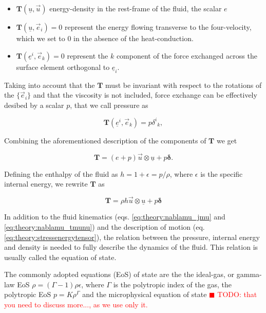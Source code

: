 \documentclass[11pt,a4paper,headinclude=true,DIV=14,BCOR=8mm,chapterprefix,listof=totoc,twoside,openright,abstracton]{scrbook}
\newcommand{\todo}[1]{\textcolor{red}{$\blacksquare$ TODO: #1}}
\begin{document}
\begin{itemize}
    \item $\boldsymbol{T}(\underline{u}, \vec{u})$ energy-density in the rest-frame of the fluid, the scalar $e$
    \item $\boldsymbol{T}(\underline{u}, \vec{e}_i) = 0$ represent the energy flowing transverse to the four-velocity, which we set to $0$ in the absence of the heat-conduction.
    \item $\boldsymbol{T}(\underline{e}^i, \vec{e}_k) = 0$ represent the $k$ component of the force exchanged across the surface element orthogonal to $\underline{e}_i$.
\end{itemize}

Taking into account that the $\boldsymbol{T}$ must be invariant with respect to the rotations of the $\{\vec{e}_i\}$ and that the viscosity is not included, force exchange can be effectively desibed by a scalar $p$, that we call pressure as

\begin{equation}
    \boldsymbol{T}(\underline{e}^i,\vec{e}_k) = p {\delta^i}_k,
\end{equation}

Combining the aforementioned description of the components of $\boldsymbol{T}$ we get

\begin{equation}
\boldsymbol{T} = (e + p)\vec{u}\otimes \underline{u} + p\boldsymbol{\delta}.
\end{equation}

Defining the enthalpy of the fluid as $h = 1 + \epsilon = p/\rho$, where $\epsilon$ is the specific internal energy, we rewrite $\boldsymbol{T}$ as 

\begin{equation}
\boldsymbol{T} = \rho h \vec{u}\otimes\underline{u} + p\boldsymbol{\delta}
\label{eq:theory:stressenergytensor}
\end{equation}

In addition to the fluid kinematics (eqs. \ref{eq:theory:nablamu_jmu} and \ref{eq:theory:nablamu_tmunu}) and the description of motion (eq. \ref{eq:theory:stressenergytensor}), the relation between the pressure, internal energy and density is needed to fully describe the dynamics of the fluid. This relation is usually called the equation of state.

The commonly adopted equations (EoS) of state are the the ideal-gas, or gamma-law EoS $\rho = (\Gamma-1)\rho\epsilon$, where $\Gamma$ is the polytropic index of the gas, the polytropic EoS $p = K\rho^{\Gamma}$ and the microphysical equation of state \todo{that you need to discuss more..., as we use only it.}
\end{document}
